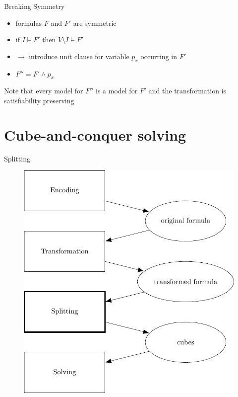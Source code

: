 \documentclass[c,8pt,xcolor...,x11names,usenames,dvipsnames]{beamer}
\begin{document}
\begin{frame}{Breaking Symmetry}
	\begin{itemize}
		\item formulas $F$ and $F'$ are symmetric
		\pause
		\item if $I \models F'$ then $V \setminus I \models F'$
		\pause
		\item $\rightarrow$ introduce unit clause for variable $p_x$ occurring in $F'$
		\item $F'' = F' \wedge p_x$
	\end{itemize}
	\vspace{5px}
	\pause
	Note that every model for $F''$ is a model for $F'$ and the transformation is satisfiability preserving
\end{frame}


\section{Cube-and-conquer solving}

\begin{frame}{Splitting}
	\begin{figure}
		\includegraphics[scale=0.65]{images/framework3}
	\end{figure}
\end{frame}
\end{document}
